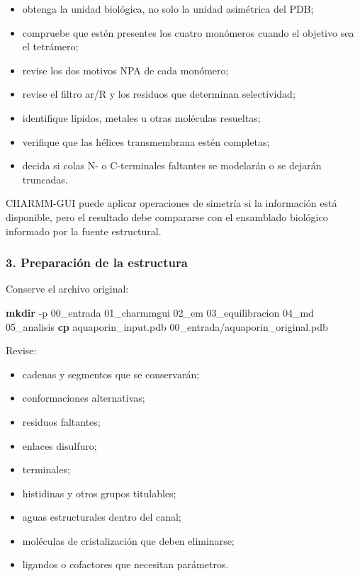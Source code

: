 \documentclass[
  spanish,
  11pt,
  a4paper]{article}
\newenvironment{Shaded}{\begin{snugshade}}{\end{snugshade}}
\newcommand{\AttributeTok}[1]{\textcolor[rgb]{0.13,0.29,0.53}{#1}}
\newcommand{\FunctionTok}[1]{\textcolor[rgb]{0.13,0.29,0.53}{\textbf{#1}}}
\newcommand{\NormalTok}[1]{#1}
\providecommand{\tightlist}{%
  \setlength{\itemsep}{0pt}\setlength{\parskip}{0pt}}
\begin{document}
\begin{itemize}
\tightlist
\item
  obtenga la unidad biológica, no solo la unidad asimétrica del PDB;
\item
  compruebe que estén presentes los cuatro monómeros cuando el objetivo
  sea el tetrámero;
\item
  revise los dos motivos NPA de cada monómero;
\item
  revise el filtro ar/R y los residuos que determinan selectividad;
\item
  identifique lípidos, metales u otras moléculas resueltas;
\item
  verifique que las hélices transmembrana estén completas;
\item
  decida si colas N- o C-terminales faltantes se modelarán o se dejarán
  truncadas.
\end{itemize}

CHARMM-GUI puede aplicar operaciones de simetría si la información está
disponible, pero el resultado debe compararse con el ensamblado
biológico informado por la fuente estructural.

\subsubsection{3. Preparación de la
estructura}\label{preparaciuxf3n-de-la-estructura}

Conserve el archivo original:

\begin{Shaded}
\begin{Highlighting}[]
\FunctionTok{mkdir} \AttributeTok{{-}p}\NormalTok{ 00\_entrada 01\_charmmgui 02\_em 03\_equilibracion 04\_md 05\_analisis}
\FunctionTok{cp}\NormalTok{ aquaporin\_input.pdb 00\_entrada/aquaporin\_original.pdb}
\end{Highlighting}
\end{Shaded}

Revise:

\begin{itemize}
\tightlist
\item
  cadenas y segmentos que se conservarán;
\item
  conformaciones alternativas;
\item
  residuos faltantes;
\item
  enlaces disulfuro;
\item
  terminales;
\item
  histidinas y otros grupos titulables;
\item
  aguas estructurales dentro del canal;
\item
  moléculas de cristalización que deben eliminarse;
\item
  ligandos o cofactores que necesitan parámetros.
\end{itemize}
\end{document}
